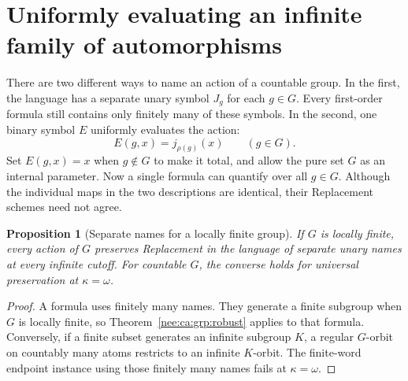 \documentclass[11pt,letterpaper]{article}
\numberwithin{equation}{section}
\theoremstyle{plain}
\newtheorem{proposition}[proposition]{Proposition}
\theoremstyle{definition}
\theoremstyle{remark}
\begin{document}
\section{Uniformly evaluating an infinite family of automorphisms}
\label{nee:ca:uni:section}

There are two different ways to name an action of a countable group.
In the first, the language has a separate unary symbol $J_g$ for each
$g\in G$.  Every first-order formula still contains only finitely many
of these symbols.  In the second, one binary symbol $E$ uniformly
evaluates the action:
\begin{equation}\label{nee:ca:uni:eq:evaluation}
 E(g,x)=j_{\rho(g)}(x)\qquad(g\in G).
\end{equation}
Set $E(g,x)=x$ when $g\notin G$ to make it total, and allow the pure set
$G$ as an internal parameter.  Now a single formula can quantify over
all $g\in G$.  Although the individual maps in the two descriptions
are identical, their Replacement schemes need not agree.

\begin{proposition}[Separate names for a locally finite group]
\label{nee:ca:uni:separate}
If $G$ is locally finite, every action of $G$ preserves Replacement in
the language of separate unary names at every infinite cutoff.
For countable $G$, the converse holds for universal preservation at
$\kappa=\omega$.
\end{proposition}
\begin{proof}
A formula uses finitely many names.  They generate a finite subgroup
when $G$ is locally finite, so Theorem~\ref{nee:ca:grp:robust} applies to that
formula.  Conversely, if a finite subset generates an infinite subgroup
$K$, a regular $G$-orbit on countably many atoms restricts to an infinite
$K$-orbit.  The finite-word endpoint instance using those finitely many
names fails at $\kappa=\omega$.
\end{proof}
\end{document}
